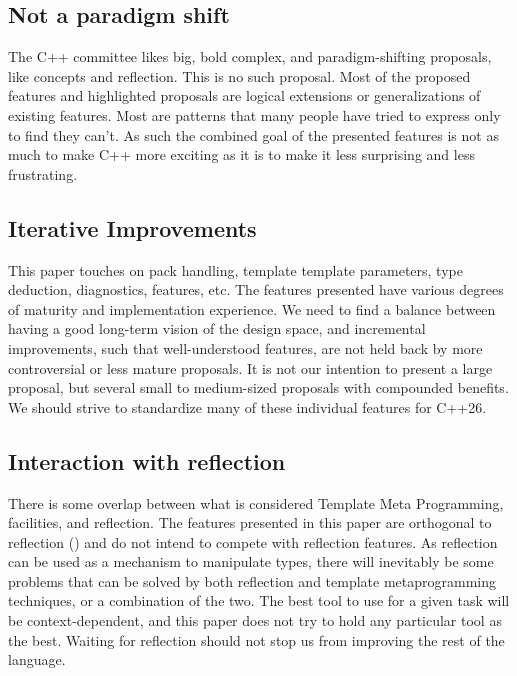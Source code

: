 \documentclass{wg21}
\begin{document}
\subsection{Not a paradigm shift}

The C++ committee likes big, bold complex, and paradigm-shifting proposals, like concepts and reflection.
This is no such proposal.
Most of the proposed features and highlighted proposals are logical extensions or generalizations of existing features.
Most are patterns that many people have tried to express only to find they can't.
As such the combined goal of the presented features is not as much to make C++ more exciting as it is to make it less surprising and less frustrating.

\subsection{Iterative Improvements}

This paper touches on pack handling, template template parameters, type deduction, diagnostics,  features, etc.
The features presented have various degrees of maturity and implementation experience.
We need to find a balance between having a good long-term vision of the design space, and incremental improvements, such that well-understood features,
are not held back by more controversial or less mature proposals.
It is not our intention to present a large proposal, but several small to medium-sized proposals with compounded benefits.
We should strive to standardize many of these individual features for C++26.

\subsection{Interaction with reflection}

There is some overlap between what is considered Template Meta Programming,  facilities, and reflection.
The features presented in this paper are orthogonal to reflection () and do not intend to compete with reflection features.
As reflection can be used as a mechanism to manipulate types, there will inevitably be some problems that can be solved by both reflection
and template metaprogramming techniques, or a combination of the two. The best tool to use for a given task will be context-dependent,
and this paper does not try to hold any particular tool as the best.
Waiting for reflection should not stop us from improving the rest of the language.
\end{document}
